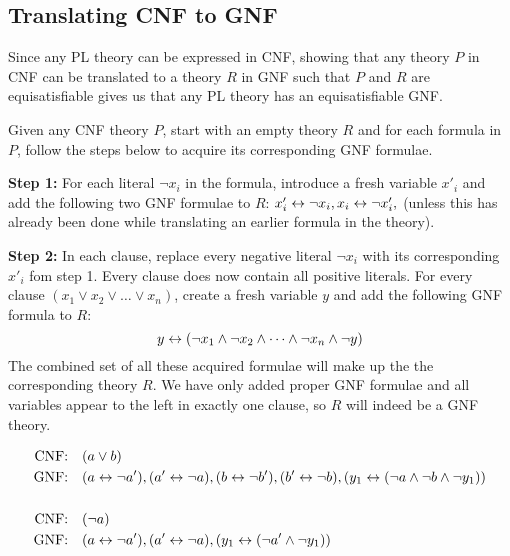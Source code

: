 \subsection{Translating CNF to GNF}
\label{sub:Translating CNF to GNF}
Since any PL theory can be expressed in CNF, showing that any theory $P$ in CNF can be translated to a theory $R$ in GNF such that $P$ and $R$ are equisatisfiable gives us that any PL theory has an equisatisfiable GNF.

Given any CNF theory $P$, start with an empty theory $R$ and for each formula in $P$, follow the steps below to acquire its corresponding GNF formulae.

\textbf{Step 1:}
For each literal $\neg x_i$ in the formula, introduce a fresh variable $x'_i$ and add the following two GNF formulae to $R$: $x'_i \leftrightarrow \neg x_i, x_i \leftrightarrow \neg x'_i,$ (unless this has already been done while translating an earlier formula in the theory).

\textbf{Step 2:}
In each clause, replace every negative literal $\neg x_i$ with its corresponding $x'_i$ fom step 1. Every clause does now contain all positive literals.
For every clause $(x_1 \vee x_2 \vee \dots \vee x_n)$, create a fresh variable $y$ and add the following GNF formula to $R$:
\[y \leftrightarrow (\neg x_1 \wedge \neg x_2 \wedge \dots \wedge \neg x_n \wedge \neg y)\]
The combined set of all these acquired formulae will make up the the corresponding theory $R$.
We have only added proper GNF formulae and all variables appear to the left in exactly one clause, so $R$ will indeed be a GNF theory.\\

\begin{example}
  \begin{align}
    \text{CNF:\quad}& ( a \vee b )\\
    \text{GNF:\quad}& ( a \leftrightarrow \neg a'), (a' \leftrightarrow \neg a), (b \leftrightarrow \neg b'), (b' \leftrightarrow \neg b), (y_1 \leftrightarrow (\neg a \wedge \neg b \wedge \neg y_1))\\
    \\
    \text{CNF:\quad}& (\neg a)\\
    \text{GNF:\quad}& ( a \leftrightarrow \neg a'), (a' \leftrightarrow \neg a), (y_1 \leftrightarrow (\neg a' \wedge \neg y_1))\\
  \end{align}
\end{example}

